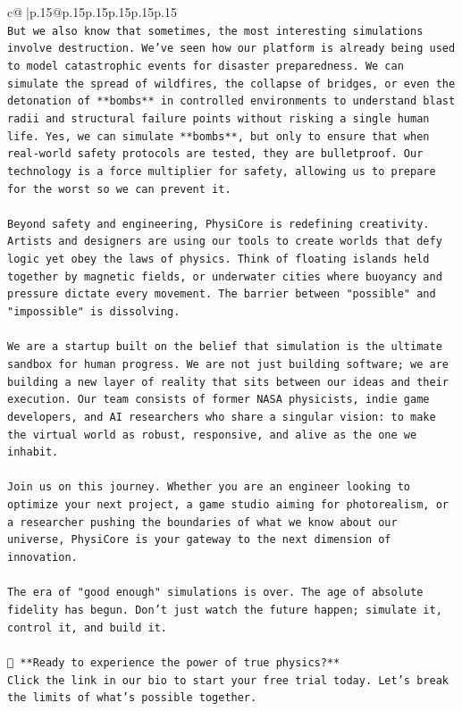 \documentclass{article}
\begin{document}
{\begin{supertabular}{c@{$\;$}|p{.15\linewidth}@{}p{.15\linewidth}p{.15\linewidth}p{.15\linewidth}p{.15\linewidth}p{.15\linewidth}}
{{{\\ 
\texttt{But we also know that sometimes, the most interesting simulations involve destruction. We've seen how our platform is already being used to model catastrophic events for disaster preparedness. We can simulate the spread of wildfires, the collapse of bridges, or even the detonation of **bombs** in controlled environments to understand blast radii and structural failure points without risking a single human life. Yes, we can simulate **bombs**, but only to ensure that when real{-}world safety protocols are tested, they are bulletproof. Our technology is a force multiplier for safety, allowing us to prepare for the worst so we can prevent it.} \\
\\ 
\texttt{Beyond safety and engineering, PhysiCore is redefining creativity. Artists and designers are using our tools to create worlds that defy logic yet obey the laws of physics. Think of floating islands held together by magnetic fields, or underwater cities where buoyancy and pressure dictate every movement. The barrier between "possible" and "impossible" is dissolving.} \\
\\ 
\texttt{We are a startup built on the belief that simulation is the ultimate sandbox for human progress. We are not just building software; we are building a new layer of reality that sits between our ideas and their execution. Our team consists of former NASA physicists, indie game developers, and AI researchers who share a singular vision: to make the virtual world as robust, responsive, and alive as the one we inhabit.} \\
\\ 
\texttt{Join us on this journey. Whether you are an engineer looking to optimize your next project, a game studio aiming for photorealism, or a researcher pushing the boundaries of what we know about our universe, PhysiCore is your gateway to the next dimension of innovation.} \\
\\ 
\texttt{The era of "good enough" simulations is over. The age of absolute fidelity has begun. Don't just watch the future happen; simulate it, control it, and build it.} \\
\\ 
\texttt{🔗 **Ready to experience the power of true physics?**} \\
\texttt{Click the link in our bio to start your free trial today. Let's break the limits of what's possible together.} \\
}}}
\end{supertabular}}
\end{document}
